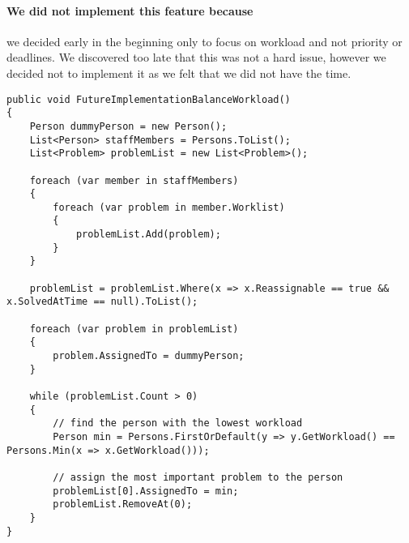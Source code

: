 \paragraph{We did not implement this feature because} we decided early in the beginning only to focus on workload and not priority or deadlines. We discovered too late that this was not a hard issue, however we decided not to implement it as we felt that we did not have the time.

\begin{lstlisting}[style=sourceCode, caption=\myCaption{A possible future implementation of the \me{BalanceWorkload} algorithm.}, label=lst:futureimplementationbalanceworkload]
public void FutureImplementationBalanceWorkload()
{
    Person dummyPerson = new Person();
    List<Person> staffMembers = Persons.ToList();
    List<Problem> problemList = new List<Problem>();

    foreach (var member in staffMembers)
    {
        foreach (var problem in member.Worklist)
        {
            problemList.Add(problem);
        }
    }

    problemList = problemList.Where(x => x.Reassignable == true && x.SolvedAtTime == null).ToList();

    foreach (var problem in problemList)
    {
        problem.AssignedTo = dummyPerson;
    }

    while (problemList.Count > 0)
    {
        // find the person with the lowest workload
        Person min = Persons.FirstOrDefault(y => y.GetWorkload() == Persons.Min(x => x.GetWorkload()));

        // assign the most important problem to the person
        problemList[0].AssignedTo = min;
        problemList.RemoveAt(0);
    }
}
\end{lstlisting}


